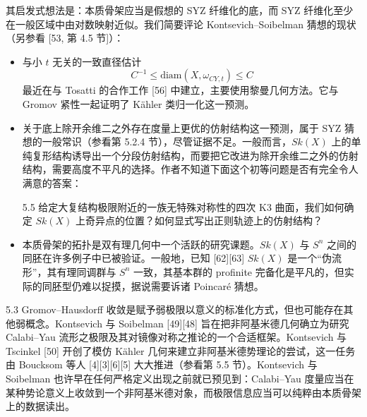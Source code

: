 其启发式想法是：本质骨架应当是假想的 SYZ 纤维化的底，而 SYZ 纤维化至少在一般区域中由对数映射近似。我们简要评论 Kontsevich--Soibelman 猜想的现状（另参看 [53, 第 4.5 节]）：
\begin{itemize}
\item 与小 $t$ 无关的一致直径估计
\[
C^{-1}\le\mathrm{diam}(X,\omega_{CY,t})\le C
\]
最近在与 Tosatti 的合作工作 [56] 中建立，主要使用黎曼几何方法。它与 Gromov 紧性一起证明了 Kähler 类归一化这一预测。
\item 关于底上除开余维二之外存在度量上更优的仿射结构这一预测，属于 SYZ 猜想的一般常识（参看第 5.2.4 节），尽管证据不足。一般而言，$Sk(X)$ 上的单纯复形结构诱导出一个分段仿射结构，而要把它改进为除开余维二之外的仿射结构，需要高度不平凡的选择。作者不知道下面这个初等问题是否有完全令人满意的答案：
\begin{question}{5.5}
给定大复结构极限附近的一族无特殊对称性的四次 K3 曲面，我们如何确定 $Sk(X)$ 上奇异点的位置？如何显式写出正则轨迹上的仿射结构？
\end{question}
\item 本质骨架的拓扑是双有理几何中一个活跃的研究课题。$Sk(X)$ 与 $S^n$ 之间的同胚在许多例子中已被验证。一般地，已知 [62][63] $Sk(X)$ 是一个“伪流形”，其有理同调群与 $S^n$ 一致，其基本群的 profinite 完备化是平凡的，但实际的同胚型仍难以捉摸，据说需要诉诸 Poincaré 猜想。
\end{itemize}



\begin{remark}{5.3}
Gromov--Hausdorff 收敛是赋予弱极限以意义的标准化方式，但也可能存在其他弱概念。Kontsevich 与 Soibelman [49][48] 旨在把非阿基米德几何确立为研究 Calabi--Yau 流形之极限及其对镜像对称之推论的一个合适框架。Kontsevich 与 Tscinkel [50] 开创了模仿 Kähler 几何来建立非阿基米德势理论的尝试，这一任务由 Boucksom 等人 [4][3][6][5] 大大推进（参看第 5.5 节）。Kontsevich 与 Soibelman 也许早在任何严格定义出现之前就已预见到：Calabi--Yau 度量应当在某种势论意义上收敛到一个非阿基米德对象，而极限信息应当可以纯粹由本质骨架上的数据读出。
\end{remark}


